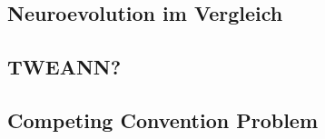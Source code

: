 \subsection{Neuroevolution im Vergleich}
\subsection{TWEANN?}
\label{subsec:tweann}
\subsection{Competing Convention Problem}
\label{subsec:competing_convention_problem}